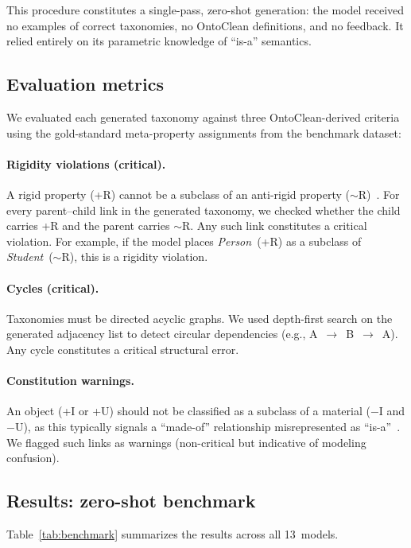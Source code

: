 \documentclass{IOS-Book-Article}
\begin{document}
This procedure constitutes a single-pass, zero-shot generation: the
model received no examples of correct taxonomies, no OntoClean
definitions, and no feedback.  It relied entirely on its parametric
knowledge of ``is-a'' semantics.

\subsection{Evaluation metrics}

We evaluated each generated taxonomy against three OntoClean-derived
criteria using the gold-standard meta-property assignments from the
benchmark dataset:

\paragraph{Rigidity violations (critical).}
A rigid property (+R) cannot be a subclass of an anti-rigid property
($\sim$R)~\cite{guarino2000formal}.  For every parent--child link in
the generated taxonomy, we checked whether the child carries +R and
the parent carries $\sim$R.  Any such link constitutes a critical
violation.  For example, if the model places \emph{Person}~(+R) as a
subclass of \emph{Student}~($\sim$R), this is a rigidity violation.

\paragraph{Cycles (critical).}
Taxonomies must be directed acyclic graphs.  We used depth-first
search on the generated adjacency list to detect circular
dependencies (e.g., A~$\rightarrow$~B~$\rightarrow$~A).  Any cycle
constitutes a critical structural error.

\paragraph{Constitution warnings.}
An object (+I or +U) should not be classified as a subclass of a
material ($-$I and $-$U), as this typically signals a ``made-of''
relationship misrepresented as
``is-a''~\cite{guarino2000formal}.  We flagged such links as
warnings (non-critical but indicative of modeling confusion).

\subsection{Results: zero-shot benchmark}

Table~\ref{tab:benchmark} summarizes the results across all 13~models.
\end{document}
